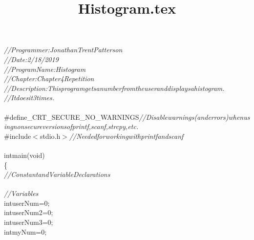 \documentclass[a4paper, 10pt]{article}
\title{Histogram.tex}
\newcommand\SPC{\hspace*{0.6em}}
\newcommand\TAB{\hspace*{1.2em}}
\newcommand\HYP{\mbox{\char 45}}
\newcommand{\CppAComment}[1]{\textit{\textcolor[rgb]{0.4,0.45,0.48}{#1}}}
\newcommand{\CppAIdentifier}[1]{\textcolor[rgb]{0.88,0.89,0.89}{#1}}
\newcommand{\CppANumber}[1]{\textcolor[rgb]{1,0.8,0.13}{#1}}
\newcommand{\CppAPreprocessor}[1]{\textcolor[rgb]{0.63,0.51,0.74}{#1}}
\newcommand{\CppAReservedWord}[1]{\textcolor[rgb]{0.4,0.55,0.69}{#1}}
\newcommand{\CppASpace}[1]{\colorbox[rgb]{0.16,0.19,0.2}{#1}}
\newcommand{\CppASymbol}[1]{\textcolor[rgb]{0.91,0.89,0.72}{#1}}
\begin{document}
\begin{ttfamily}
\noindent
\CppAComment{//\SPC Programmer:\TAB \TAB Jonathan\SPC Trent\SPC Patterson}\\
\CppAComment{//\SPC Date:\TAB \TAB \TAB 2/18/2019}\\
\CppAComment{//\SPC Program\SPC Name:\TAB Histogram}\\
\CppAComment{//\SPC Chapter:\TAB \TAB \TAB Chapter\SPC 4\SPC \HYP \SPC Repetition\SPC \SPC }\\
\CppAComment{//\SPC Description:\TAB \TAB This\SPC program\SPC gets\SPC a\SPC number\SPC from\SPC the\SPC user\SPC and\SPC displays\SPC a\SPC histogram.}\\
\CppAComment{//\TAB \TAB \TAB \TAB \TAB It\SPC does\SPC it\SPC 3\SPC times.}\\
\\
\CppAPreprocessor{\#define\SPC \_CRT\_SECURE\_NO\_WARNINGS\SPC }\CppAComment{//\SPC Disable\SPC warnings\SPC (and\SPC errors)\SPC when\SPC using\SPC non\HYP secure\SPC versions\SPC of\SPC printf,\SPC scanf,\SPC strcpy,\SPC etc.}\\
\CppAPreprocessor{\#include\SPC $<$stdio.h$>$\SPC }\CppAComment{//\SPC Needed\SPC for\SPC working\SPC with\SPC printf\SPC and\SPC scanf}\\
\\
\CppAReservedWord{int}\CppASpace{\SPC }\CppAIdentifier{main}\CppASymbol{(}\CppAReservedWord{void}\CppASymbol{)}\\
\CppASymbol{\{}\\
\CppASpace{\TAB }\CppAComment{//\SPC Constant\SPC and\SPC Variable\SPC Declarations}\\
\\
\CppASpace{\TAB }\CppAComment{//\SPC Variables}\\
\CppASpace{\TAB }\CppAReservedWord{int}\CppASpace{\SPC }\CppAIdentifier{userNum}\CppASpace{\SPC }\CppASymbol{=}\CppASpace{\SPC }\CppANumber{0}\CppASymbol{;}\\
\CppASpace{\TAB }\CppAReservedWord{int}\CppASpace{\SPC }\CppAIdentifier{userNum2}\CppASpace{\SPC }\CppASymbol{=}\CppASpace{\SPC }\CppANumber{0}\CppASymbol{;}\\
\CppASpace{\TAB }\CppAReservedWord{int}\CppASpace{\SPC }\CppAIdentifier{userNum3}\CppASpace{\SPC }\CppASymbol{=}\CppASpace{\SPC }\CppANumber{0}\CppASymbol{;}\\
\CppASpace{\TAB }\CppAReservedWord{int}\CppASpace{\SPC }\CppAIdentifier{myNum}\CppASpace{\SPC }\CppASymbol{=}\CppASpace{\SPC }\CppANumber{0}\CppASymbol{;}\\

\end{ttfamily}
\end{document}
